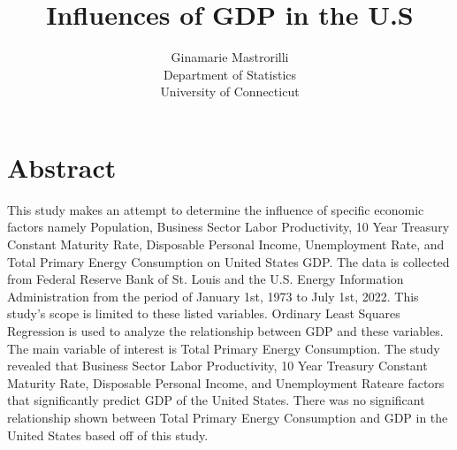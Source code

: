 \documentclass[12pt]{article}
\title{Influences of GDP in the U.S }
\author{Ginamarie Mastrorilli\\
  Department of Statistics\\
  University of Connecticut
}
\begin{document}
\maketitle


\section*{Abstract}
This study makes an attempt to determine the influence of specific economic factors namely Population, Business Sector Labor Productivity, 10 Year Treasury Constant Maturity Rate, Disposable Personal Income, Unemployment Rate, and Total Primary Energy Consumption on United States GDP.
The data is collected from Federal Reserve Bank of St. Louis  and the U.S. Energy Information Administration from the period of January 1st, 1973 to July 1st, 2022. 
This study’s scope is limited to these listed variables. 
Ordinary Least Squares Regression is used to analyze the relationship between GDP and these variables. 
The main variable of interest is Total Primary Energy Consumption. 
The study revealed that Business Sector Labor Productivity, 10 Year Treasury Constant Maturity Rate, Disposable Personal Income, and Unemployment Rateare factors that significantly predict GDP of the United States.
There was no significant relationship shown between Total Primary Energy Consumption and GDP in the United States based off of this study. 
\end{document}
